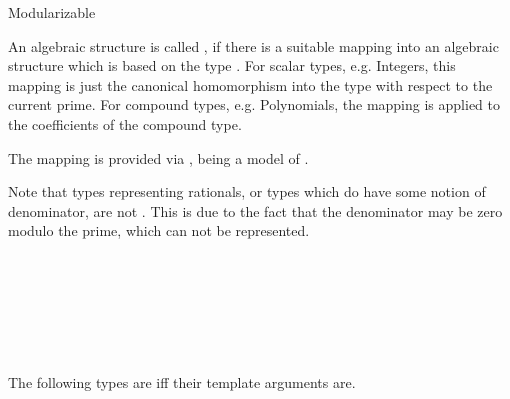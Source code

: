 \begin{ccRefConcept}{Modularizable}

\ccDefinition

An algebraic structure is called \ccRefName, if there is a suitable mapping 
into an algebraic structure which is based on the type . 
For scalar types, e.g. Integers, this mapping is just the canonical homomorphism 
into the type  with respect to the current prime. 
For compound types, e.g. Polynomials, 
the mapping is applied to the coefficients of the compound type. 

The mapping is provided via , 
being a model of .

Note that types representing rationals, or types which do have some notion 
of denominator, are not . 
This is due to the fact that the denominator may be zero modulo the prime, 
which can not be represented.  


\ccHasModels

\\
\\
\\
\\
\\
\\

The following types are  iff their template arguments are. 
\\ 
\\
\\ 

\ccSeeAlso
{}\\
\\

\end{ccRefConcept}